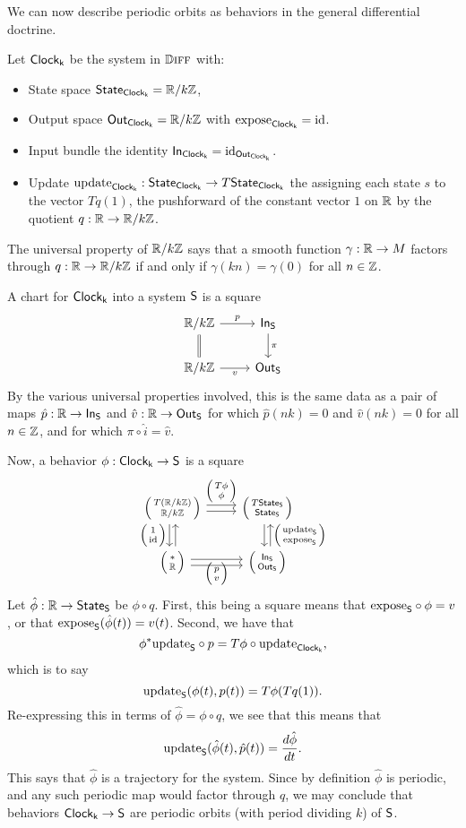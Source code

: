 \documentclass[DynamicalBook]{subfiles}
\begin{document}
We can now describe periodic orbits as behaviors in the general differential doctrine.
\begin{example}
  Let $\mathsf{Clock_k}$ be the system in $\mathbb{D}\textsc{iff}$ with:
\begin{itemize}
 \item State space $ \mathsf{State}_{\mathsf{Clock_k}} = \mathbb{R} / k \mathbb{Z}$,
 \item Output space $\mathsf{Out}_{\mathsf{Clock_k}} = \mathbb{R} / k \mathbb{Z}$ with $\mathrm{expose}_{\mathsf{Clock_k}} = \mathrm{id}$.
 \item Input bundle the identity $\mathsf{In}_{\mathsf{Clock_k}} = \mathrm{id}_{\mathsf{Out}_{\mathsf{Clock_k}}}$.
 \item Update $\mathrm{update}_{\mathsf{Clock_k}} : \mathsf{State}_{\mathsf{Clock_k}} \to T\mathsf{State}_{\mathsf{Clock_k}}$ the
   assigning each state $s$ to the vector $Tq(1)$, the pushforward of the
   constant vector $1$ on $\mathbb{R}$ by the quotient
   $q : \mathbb{R} \to \mathbb{R} / k \mathbb{Z}$.
\end{itemize}
The universal property of $\mathbb{R} / k \mathbb{Z}$ says that a smooth function $\gamma :
\mathbb{R} \to M$ factors through $q : \mathbb{R} \to \mathbb{R} / k \mathbb{Z}$ if and only if $\gamma(kn)
= \gamma(0)$ for all $n \in \mathbb{Z}$.

A chart for $\mathsf{Clock_k}$ into a system $\mathsf{S}$ is a square
\[
  \begin{tikzcd}
    \rr / k \zz \ar[r, "p"] \ar[d, equals] & \In{S} \ar[d, "\pi"] \\
    \rr / k \zz \ar[r, "v"'] & \Out{S}
  \end{tikzcd}
\]
By the various universal properties involved, this is the same data as a pair of maps $\hat{p} : \mathbb{R} \to
\mathsf{In}_{\mathsf{S}}$ and $\hat{v} : \mathbb{R} \to \mathsf{Out}_{\mathsf{S}}$ for which $\hat{p}(nk) = 0$ and
$\hat{v}(nk) = 0$ for all $n \in \mathbb{Z}$, and for which $\pi \circ \hat{i} =
\hat{v}$.

Now, a behavior $\phi : \mathsf{Clock_k} \to \mathsf{S}$ is a square
  \[
    \begin{tikzcd}
      \lens{T(\rr / k \zz)}{\rr / k \zz} \ar[r, shift left, "\lens{T\phi}{\phi}"] \ar[r, shift right] \ar[d, shift right,
      "\lens{1}{\id}"'] \ar[d, shift left, leftarrow] &
      \lens{T\State{S}}{\State{S}} \ar[d, shift left, leftarrow,
      "\lens{\update{S}}{\expose{S}}"] \ar[d, shift right]\\
      \lens{{\ast}}{\rr} \ar[r, shift right] \ar[r,
      shift left, "\lens{p}{v}"'] & \lens{\In{S}}{\Out{S}}
    \end{tikzcd}
  \]
  Let $\hat{\phi} : \mathbb{R} \to \mathsf{State}_{\mathsf{S}}$ be $\phi \circ q$. First, this being a
  square means that $\mathrm{expose}_{\mathsf{S}} \circ \phi = v$, or that
  $\mathrm{expose}_{\mathsf{S}}(\hat{\phi}(t)) = v(t)$. Second, we have that
  \[
\phi^{\ast}\mathrm{update}_{\mathsf{S}} \circ p = T\phi \circ \mathrm{update}_{\mathsf{Clock_k}},
  \]
  which is to say
  \[
\mathrm{update}_{\mathsf{S}}(\phi(t), p(t)) = T\phi(Tq(1)).
\]
Re-expressing this in terms of $\hat{\phi} = \phi \circ q$, we see that this
means that
\[
\mathrm{update}_{\mathsf{S}}(\hat{\phi}(t), \hat{p}(t)) = \frac{d\hat{\phi}}{dt}.
\]
This says that $\hat{\phi}$ is a trajectory for the system. Since by definition
$\hat{\phi}$ is periodic, and any such periodic map would factor through $q$, we
may conclude that behaviors $\mathsf{Clock_k} \to \mathsf{S}$ are periodic orbits
(with period dividing $k$) of $\mathsf{S}$.
\end{example}
\end{document}
